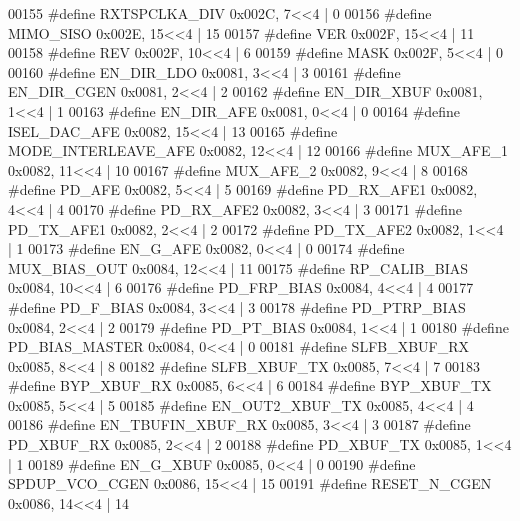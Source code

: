 \begin{DoxyCode}
00155 \textcolor{preprocessor}{#define RXTSPCLKA\_DIV 0x002C, 7<<4 |  0}
00156 \textcolor{preprocessor}{#define MIMO\_SISO 0x002E, 15<<4 |  15}
00157 \textcolor{preprocessor}{#define VER 0x002F, 15<<4 |  11}
00158 \textcolor{preprocessor}{#define REV 0x002F, 10<<4 |  6}
00159 \textcolor{preprocessor}{#define MASK 0x002F, 5<<4 |  0}
00160 \textcolor{preprocessor}{#define EN\_DIR\_LDO 0x0081, 3<<4 |  3}
00161 \textcolor{preprocessor}{#define EN\_DIR\_CGEN 0x0081, 2<<4 |  2}
00162 \textcolor{preprocessor}{#define EN\_DIR\_XBUF 0x0081, 1<<4 |  1}
00163 \textcolor{preprocessor}{#define EN\_DIR\_AFE 0x0081, 0<<4 |  0}
00164 \textcolor{preprocessor}{#define ISEL\_DAC\_AFE 0x0082, 15<<4 |  13}
00165 \textcolor{preprocessor}{#define MODE\_INTERLEAVE\_AFE 0x0082, 12<<4 |  12}
00166 \textcolor{preprocessor}{#define MUX\_AFE\_1 0x0082, 11<<4 |  10}
00167 \textcolor{preprocessor}{#define MUX\_AFE\_2 0x0082, 9<<4 |  8}
00168 \textcolor{preprocessor}{#define PD\_AFE 0x0082, 5<<4 |  5}
00169 \textcolor{preprocessor}{#define PD\_RX\_AFE1 0x0082, 4<<4 |  4}
00170 \textcolor{preprocessor}{#define PD\_RX\_AFE2 0x0082, 3<<4 |  3}
00171 \textcolor{preprocessor}{#define PD\_TX\_AFE1 0x0082, 2<<4 |  2}
00172 \textcolor{preprocessor}{#define PD\_TX\_AFE2 0x0082, 1<<4 |  1}
00173 \textcolor{preprocessor}{#define EN\_G\_AFE 0x0082, 0<<4 |  0}
00174 \textcolor{preprocessor}{#define MUX\_BIAS\_OUT 0x0084, 12<<4 |  11}
00175 \textcolor{preprocessor}{#define RP\_CALIB\_BIAS 0x0084, 10<<4 |  6}
00176 \textcolor{preprocessor}{#define PD\_FRP\_BIAS 0x0084, 4<<4 |  4}
00177 \textcolor{preprocessor}{#define PD\_F\_BIAS 0x0084, 3<<4 |  3}
00178 \textcolor{preprocessor}{#define PD\_PTRP\_BIAS 0x0084, 2<<4 |  2}
00179 \textcolor{preprocessor}{#define PD\_PT\_BIAS 0x0084, 1<<4 |  1}
00180 \textcolor{preprocessor}{#define PD\_BIAS\_MASTER 0x0084, 0<<4 |  0}
00181 \textcolor{preprocessor}{#define SLFB\_XBUF\_RX 0x0085, 8<<4 |  8}
00182 \textcolor{preprocessor}{#define SLFB\_XBUF\_TX 0x0085, 7<<4 |  7}
00183 \textcolor{preprocessor}{#define BYP\_XBUF\_RX 0x0085, 6<<4 |  6}
00184 \textcolor{preprocessor}{#define BYP\_XBUF\_TX 0x0085, 5<<4 |  5}
00185 \textcolor{preprocessor}{#define EN\_OUT2\_XBUF\_TX 0x0085, 4<<4 |  4}
00186 \textcolor{preprocessor}{#define EN\_TBUFIN\_XBUF\_RX 0x0085, 3<<4 |  3}
00187 \textcolor{preprocessor}{#define PD\_XBUF\_RX 0x0085, 2<<4 |  2}
00188 \textcolor{preprocessor}{#define PD\_XBUF\_TX 0x0085, 1<<4 |  1}
00189 \textcolor{preprocessor}{#define EN\_G\_XBUF 0x0085, 0<<4 |  0}
00190 \textcolor{preprocessor}{#define SPDUP\_VCO\_CGEN 0x0086, 15<<4 |  15}
00191 \textcolor{preprocessor}{#define RESET\_N\_CGEN 0x0086, 14<<4 |  14}

\end{DoxyCode}
